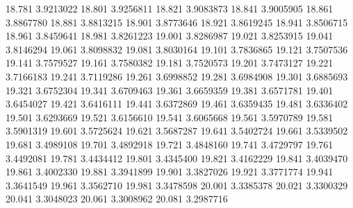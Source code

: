 18.781 3.9213022
18.801 3.9256811
18.821 3.9083873
18.841 3.9005905
18.861 3.8867780
18.881 3.8813215
18.901 3.8773646
18.921 3.8619245
18.941 3.8506715
18.961 3.8459641
18.981 3.8261223
19.001 3.8286987
19.021 3.8253915
19.041 3.8146294
19.061 3.8098832
19.081 3.8030164
19.101 3.7836865
19.121 3.7507536
19.141 3.7579527
19.161 3.7580382
19.181 3.7520573
19.201 3.7473127
19.221 3.7166183
19.241 3.7119286
19.261 3.6998852
19.281 3.6984908
19.301 3.6885693
19.321 3.6752304
19.341 3.6709463
19.361 3.6659359
19.381 3.6571781
19.401 3.6454027
19.421 3.6416111
19.441 3.6372869
19.461 3.6359435
19.481 3.6336402
19.501 3.6293669
19.521 3.6156610
19.541 3.6065668
19.561 3.5970789
19.581 3.5901319
19.601 3.5725624
19.621 3.5687287
19.641 3.5402724
19.661 3.5339502
19.681 3.4989108
19.701 3.4892918
19.721 3.4848160
19.741 3.4729797
19.761 3.4492081
19.781 3.4434412
19.801 3.4345400
19.821 3.4162229
19.841 3.4039470
19.861 3.4002330
19.881 3.3941899
19.901 3.3827026
19.921 3.3771774
19.941 3.3641549
19.961 3.3562710
19.981 3.3478598
20.001 3.3385378
20.021 3.3300329
20.041 3.3048023
20.061 3.3008962
20.081 3.2987716
